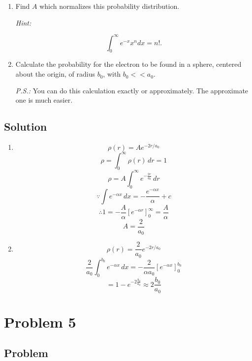 \documentclass[12pt]{article}
\begin{document}
\renewcommand{\labelenumi}{(\alph{enumi})}
\begin{enumerate}
    \item Find $A$ which normalizes this probability distribution.

          \textit{Hint:}

          \begin{equation}
              \int_{0}^{\infty} e^{-x} x^{n} d x=n!.
          \end{equation}
    \item Calculate the probability for the electron to be found in a sphere, centered about the origin, of radius $b_{0}$, with $b_{0}<<a_{0}$.

          \textit{P.S.:} You can do this calculation exactly or approximately. The approximate one is much easier.
\end{enumerate}

\subsection{Solution}


\renewcommand{\labelenumi}{(\alph{enumi})}
\begin{enumerate}
    \item
          \[
              \rho(r) = A e^{-2 r / a_{0}}
          \]
          \[
              \rho = \int_{0}^{\infty}{\rho(r)}\,dr = 1
          \]
          \[
              \rho = A \int_{0}^{\infty}{e^{-\frac{2r}{a_{0}}}}\,dr
          \]
          \[
              \because \int{e^{-\alpha x}}\,dx = -\frac{e^{-\alpha x}}{\alpha} + c
          \]
          \[
              \therefore 1 = - \frac{A}{\alpha}{\left[e^{- \alpha r}\right]}^{\infty}_0 = \frac{A}{\alpha}
          \]
          \[
              A = \frac{2}{a_0}
          \]
    \item
          \[
              \rho(r) = \frac{2}{a_0} e^{-2 r / a_{0}}
          \]
          \[
              \frac{2}{a_0}\int_0^{b_0}{e^{-\alpha x}}\,dx = -\frac{2}{\alpha a_0}\left[e^{-\alpha x}\right]^{b_0}_0
          \]
          \[
              = 1 - e^{-2 \frac{b_0}{a_0}} \approx 2 \frac{b_0}{a_0}
          \]
\end{enumerate}

\section{Problem 5}

\subsection{Problem}
\end{document}
